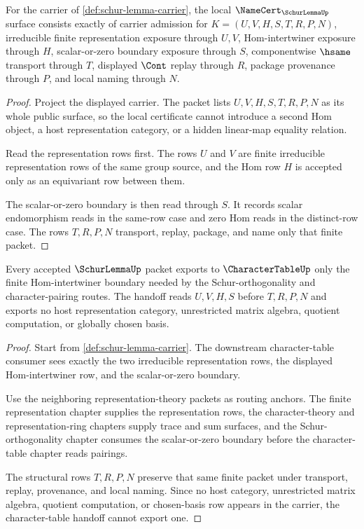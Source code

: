 \begin{theorem}
\label{thm:schur-lemma-namecert-obligations}
For the carrier of \autoref{def:schur-lemma-carrier}, the local $\NameCert_{\SchurLemmaUp}$ surface consists exactly of carrier admission for $K=(U,V,H,S,T,R,P,N)$, irreducible finite representation exposure through $U,V$, Hom-intertwiner exposure through $H$, scalar-or-zero boundary exposure through $S$, componentwise $\hsame$ transport through $T$, displayed $\Cont$ replay through $R$, package provenance through $P$, and local naming through $N$.
\end{theorem}
\begin{proof}
Project the displayed carrier. The packet lists $U,V,H,S,T,R,P,N$ as its whole public surface, so the local certificate cannot introduce a second Hom object, a host representation category, or a hidden linear-map equality relation.

Read the representation rows first. The rows $U$ and $V$ are finite irreducible representation rows of the same group source, and the Hom row $H$ is accepted only as an equivariant row between them.

The scalar-or-zero boundary is then read through $S$. It records scalar endomorphism reads in the same-row case and zero Hom reads in the distinct-row case. The rows $T,R,P,N$ transport, replay, package, and name only that finite packet.
\end{proof}

\begin{theorem}
\label{thm:schur-lemma-character-table-handoff}
Every accepted $\SchurLemmaUp$ packet exports to $\CharacterTableUp$ only the finite Hom-intertwiner boundary needed by the Schur-orthogonality and character-pairing routes. The handoff reads $U,V,H,S$ before $T,R,P,N$ and exports no host representation category, unrestricted matrix algebra, quotient computation, or globally chosen basis.
\end{theorem}
\begin{proof}
Start from \autoref{def:schur-lemma-carrier}. The downstream character-table consumer sees exactly the two irreducible representation rows, the displayed Hom-intertwiner row, and the scalar-or-zero boundary.

Use the neighboring representation-theory packets as routing anchors. The finite representation chapter supplies the representation rows, the character-theory and representation-ring chapters supply trace and sum surfaces, and the Schur-orthogonality chapter consumes the scalar-or-zero boundary before the character-table chapter reads pairings.

The structural rows $T,R,P,N$ preserve that same finite packet under transport, replay, provenance, and local naming. Since no host category, unrestricted matrix algebra, quotient computation, or chosen-basis row appears in the carrier, the character-table handoff cannot export one.
\end{proof}

